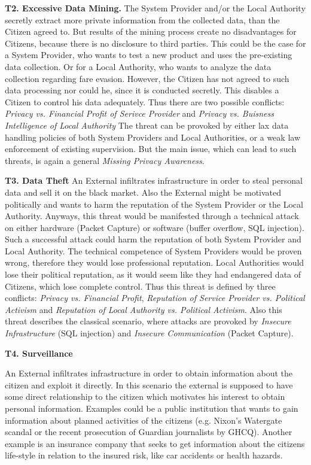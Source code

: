 \textbf{T2. Excessive Data Mining.}
The System Provider and/or the Local Authority secretly extract more private information from the collected data, than the Citizen agreed to.
But results of the mining process create no disadvantages for Citizens, because there is no disclosure to third parties.
This could be the case for a System Provider, who wants to test a new product and uses the pre-existing data collection.
Or for a Local Authority, who wants to analyze the data collection regarding fare evasion.
However, the Citizen has not agreed to such data processing nor could he, since it is conducted secretly.
This disables a Citizen to control his data adequately.
Thus there are two possible conflicts: \textit{Privacy vs. Financial Profit of Serivce Provider} and  \textit{Privacy vs. Buisness Intelligence of Local Authority}
The threat can be provoked by either lax data handling policies of both System Providers and Local Authorities, or a weak law enforcement of existing supervision.
But the main issue, which can lead to such threats, is again a general \textit{Missing Privacy Awareness}.

\textbf{T3. Data Theft}
An External infiltrates infrastructure in order to steal personal data and sell it on the black market.
Also the External might be motivated politically and wants to harm the reputation of the System Provider or the Local Authority.
Anyways, this threat would be manifested through a technical attack on either hardware (Packet Capture) or software (buffer overflow, SQL injection).
Such a successful attack could harm the reputation of both System Provider and Local Authority.
The technical competence of System Providers would be proven wrong, therefore they would lose professional reputation.
Local Authorities would lose their political reputation, as it would seem like they had endangered data of Citizens, which lose complete control.
Thus this threat is defined by three conflicts: \textit{Privacy vs. Financial Profit}, \textit{Reputation of Service Provider vs. Political Activism} and \textit{Reputation of Local Authority vs. Political Activism}.
Also this threat describes the classical scenario, where attacks are provoked by \textit{Insecure Infrastructure} (SQL injection) and \textit{Insecure Communication} (Packet Capture).

\textbf{T4. Surveillance}

An External infiltrates infrastructure in order to obtain information
about the citizen and exploit it directly.  In this scenario the
external is supposed to have some direct relationship to the citizen
which motivates his interest to obtain personal information.  Examples
could be a public institution that wants to gain information about
planned activities of the citizens (e.g. Nixon's Watergate scandal or
the recent prosecution of Guardian journalists by GHCQ).  Another
example is an insurance company that seeks to get information about
the citizens life-style in relation to the insured risk, like car
accidents or health hazards.

